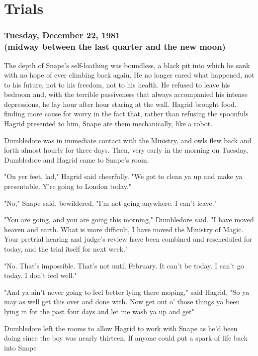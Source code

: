 
\chapter{Trials}

\subsection{Tuesday, December 22, 1981 \\ (midway between the last quarter and the new moon)}

The depth of Snape's self-loathing was boundless, a black pit into which he sank with no hope of ever climbing back again. He no longer cared what happened, not to his future, not to his freedom, not to his health. He refused to leave his bedroom and, with the terrible passiveness that always accompanied his intense depressions, he lay hour after hour staring at the wall. Hagrid brought food, finding more cause for worry in the fact that, rather than refusing the spoonfuls Hagrid presented to him, Snape ate them mechanically, like a robot.

Dumbledore was in immediate contact with the Ministry, and owls flew back and forth almost hourly for three days. Then, very early in the morning on Tuesday, Dumbledore and Hagrid came to Snape's room.

"On yer feet, lad," Hagrid said cheerfully. "We got to clean ya up and make ya presentable. Y're going to London today."

"No," Snape said, bewildered, "I'm not going anywhere. I can't leave."

"You are going, and you are going this morning," Dumbledore said. "I have moved heaven and earth. What is more difficult, I have moved the Ministry of Magic. Your pretrial hearing and judge's review have been combined and rescheduled for today, and the trial itself for next week."

"No. That's impossible. That's not until February. It can't be today. I can't go today. I don't feel well."

"And ya ain't never going to feel better lying there moping," said Hagrid. "So ya may as well get this over and done with. Now get out o' those things ya been lying in for the past four days and let me wash ya up and get{\el}"

Dumbledore left the rooms to allow Hagrid to work with Snape as he'd been doing since the boy was nearly thirteen. If anyone could put a spark of life back into Snape{\el}

